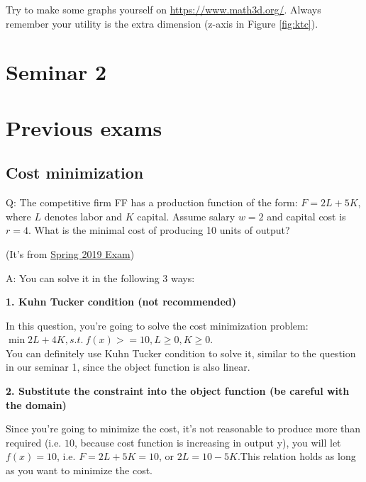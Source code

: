 \documentclass{article}
\begin{document}
\vspace{2mm}

Try to make some graphs yourself on \href{https://www.math3d.org/}{https://www.math3d.org/}. Always remember your utility is the 
extra dimension (z-axis in Figure \ref{fig:ktc}).


\section{Seminar 2}


\section{Previous exams}

\subsection{Cost minimization}

Q: The competitive firm FF has a production function of the form:
$F = 2L + 5K$, where $L$ denotes labor and $K$ capital. Assume salary $w=2$ and capital cost is $r=4$. What is the minimal cost of producing 10 units of output?

(It's from \href{https://www.uio.no/studier/emner/sv/oekonomi/ECON3200/previous-exams/econ32_4200-2019v-sensorveiledning.pdf}{Spring 2019 Exam})

\bigskip
A: You can solve it in the following 3 ways:

\medskip

\textbf{1. Kuhn Tucker condition (not recommended)}

In this question, you're going to solve the cost minimization problem: $\min 2L + 4K , s.t. \  f(x) > = 10, L\ge0, K\ge0$. \\
You can definitely use Kuhn Tucker condition to solve it, similar to the question in our seminar 1, since the object function is also linear. 

\bigskip

\textbf{2. Substitute the constraint into the object function (be careful with the domain)}

Since you're going to minimize the cost, it's not reasonable to produce more than required (i.e. $10$, because cost function is increasing in output y), you will let $f(x)=10$, i.e. $F= 2L+5K=10$, or $2L=10-5K$.​ This relation holds as long as you want to minimize the cost. 
\medskip
\end{document}
